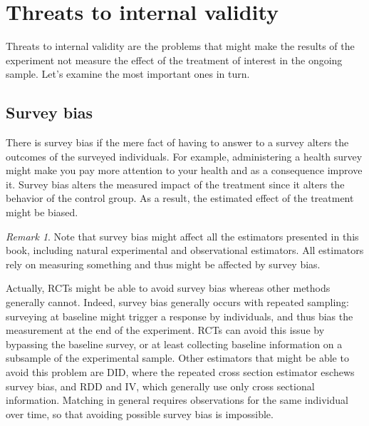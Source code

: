 \documentclass[
]{book}
\theoremstyle{definition}
\theoremstyle{definition}
\theoremstyle{definition}
\theoremstyle{definition}
\theoremstyle{remark}
\newtheorem*{remark}{Remark}
\begin{document}
\hypertarget{threats-to-internal-validity}{%
\section{Threats to internal validity}\label{threats-to-internal-validity}}

Threats to internal validity are the problems that might make the results of the experiment not measure the effect of the treatment of interest in the ongoing sample.
Let's examine the most important ones in turn.

\hypertarget{survey-bias}{%
\subsection{Survey bias}\label{survey-bias}}

There is survey bias if the mere fact of having to answer to a survey alters the outcomes of the surveyed individuals.
For example, administering a health survey might make you pay more attention to your health and as a consequence improve it.
Survey bias alters the measured impact of the treatment since it alters the behavior of the control group.
As a result, the estimated effect of the treatment might be biased.

\begin{remark}
\iffalse{} {Remark. } \fi{}Note that survey bias might affect all the estimators presented in this book, including natural experimental and observational estimators.
All estimators rely on measuring something and thus might be affected by survey bias.

Actually, RCTs might be able to avoid survey bias whereas other methods generally cannot.
Indeed, survey bias generally occurs with repeated sampling: surveying at baseline might trigger a response by individuals, and thus bias the measurement at the end of the experiment.
RCTs can avoid this issue by bypassing the baseline survey, or at least collecting baseline information on a subsample of the experimental sample.
Other estimators that might be able to avoid this problem are DID, where the repeated cross section estimator eschews survey bias, and RDD and IV, which generally use only cross sectional information.
Matching in general requires observations for the same individual over time, so that avoiding possible survey bias is impossible.
\end{remark}
\end{document}
